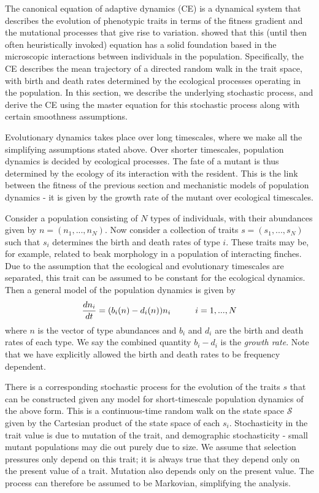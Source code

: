 The canonical equation of adaptive dynamics (CE) is a dynamical system that describes the evolution of phenotypic traits in terms of the fitness gradient and the mutational processes that give rise to variation.
\cite{dieckmann_dynamical_1996} showed that this (until then often heuristically invoked) equation has a solid foundation based in the microscopic interactions between individuals in the population.
Specifically, the CE describes the mean trajectory of a directed random walk in the trait space, with birth and death rates determined by the ecological processes operating in the population. 
In this section, we describe the underlying stochastic process, and derive the CE using the master equation for this stochastic process along with certain smoothness assumptions. 

Evolutionary dynamics takes place over long timescales, where we make all the simplifying assumptions stated above. 
Over shorter timescales, population dynamics is decided by ecological processes.
The fate of a mutant is thus determined by the ecology of its interaction with the resident. 
This is the link between the fitness of the previous section and mechanistic models of population dynamics - it is given by the growth rate of the mutant over ecological timescales. 

Consider a population consisting of $N$ types of individuals, with their abundances given by $n = (n_1, ..., n_N)$. 
Now consider a collection of traits $s = (s_1, ..., s_N)$ such that $s_i$ determines the birth and death rates of type $i$. 
These traits may be, for example, related to beak morphology in a population of interacting finches.
Due to the assumption that the ecological and evolutionary timescales are separated, this trait can be assumed to be constant for the ecological dynamics.  Then a general model of the population dynamics is given by 
\begin{align}
	\frac{dn_i}{dt} = (b_i(n) - d_i(n))  n_i \hspace{10mm} i = 1, ... , N
	\label{eqn:bi-di-eqn-form}
\end{align} 
where $n$ is the vector of type abundances and $b_i$ and $d_i$ are the birth and death rates of each type. 
We say the combined quantity $b_i-d_i$ is the \textit{growth rate}. 
Note that we have explicitly allowed the birth and death rates to be frequency dependent.

There is a corresponding stochastic process for the evolution of the traits $s$ that can be constructed given any model for short-timescale population dynamics of the above form. 
This is a continuous-time random walk on the state space $\mathcal{S}$ given by the Cartesian product of the state space of each $s_i$. 
Stochasticity in the trait value is due to mutation of the trait, and demographic stochasticity - small mutant populations may die out purely due to size. 
We assume that selection pressures only depend on this trait; it is always true that they depend only on the present value of a trait.
Mutation also depends only on the present value. 
The process can therefore be assumed to be Markovian, simplifying the analysis.


